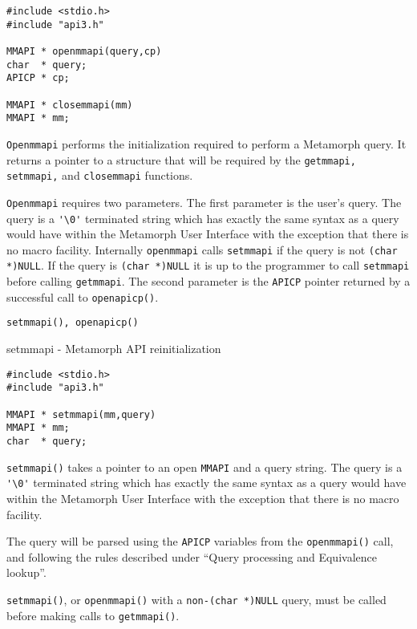 \SYNOPSIS
\begin{verbatim}
#include <stdio.h>
#include "api3.h"

MMAPI * openmmapi(query,cp)
char  * query;
APICP * cp;

MMAPI * closemmapi(mm)
MMAPI * mm;

\end{verbatim}

\DESCRIPTION

\verb`Openmmapi` performs the initialization required to perform a
Metamorph query. It returns a pointer to a structure that will be
required by the \verb`getmmapi, setmmapi,` and \verb`closemmapi` functions.

\verb`Openmmapi` requires two parameters.  The first parameter is the
user's query.  The query is a \verb`'\0'` terminated string which has
exactly the same syntax as a query would have within the Metamorph
User Interface with the exception that there is no macro facility.
Internally \verb`openmmapi` calls \verb`setmmapi` if the query is not
\verb`(char *)NULL`.  If the query is \verb`(char *)NULL` it is up to the
programmer to call \verb`setmmapi` before calling \verb`getmmapi`.  The second
parameter is the \verb`APICP` pointer returned by a successful call
to \verb`openapicp()`.

\SEE
\begin{verbatim}
setmmapi(), openapicp()
\end{verbatim}

\NAME
{setmmapi - Metamorph API reinitialization}

\SYNOPSIS
\begin{verbatim}
#include <stdio.h>
#include "api3.h"

MMAPI * setmmapi(mm,query)
MMAPI * mm;
char  * query;

\end{verbatim}

\DESCRIPTION

\verb`setmmapi()` takes a pointer to an open \verb`MMAPI` and a query string.
The query is a \verb`'\0'` terminated string which has exactly the same
syntax as a query would have within the Metamorph User Interface
with the exception that there is no macro facility.

The query will be parsed using the \verb`APICP` variables from the
\verb`openmmapi()` call, and following the rules described under ``Query
processing and Equivalence lookup''.

\verb`setmmapi()`, or \verb`openmmapi()` with a \verb`non-(char *)NULL` query, must be
called before making calls to \verb`getmmapi()`.

